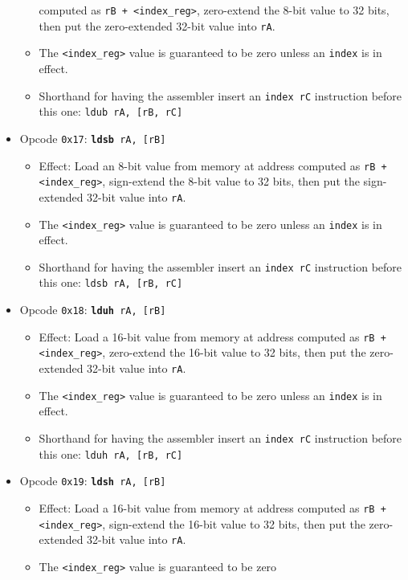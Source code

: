 \documentclass{article}
\begin{document}
\begin{itemize}
\begin{itemize}
		computed as \texttt{rB + <index\_reg>}, zero-extend
		the 8-bit value to 32 bits, then put the zero-extended 32-bit
		value into \texttt{rA}.
		\item The \texttt{<index\_reg>} value is guaranteed to be zero
		unless an \texttt{index} is in effect.
		\item Shorthand for having the assembler insert an
		\texttt{index rC} instruction before this one:
			\texttt{ldub rA, [rB, rC]}
		\end{itemize}
	\item Opcode \texttt{0x17}:
		\texttt{\textbf{ldsb} rA, [rB]}
		\begin{itemize}
		\item Effect: Load an 8-bit value from memory at address
		computed as \texttt{rB + <index\_reg>}, sign-extend
		the 8-bit value to 32 bits, then put the sign-extended 32-bit
		value into \texttt{rA}.
		\item The \texttt{<index\_reg>} value is guaranteed to be zero
		unless an \texttt{index} is in effect.
		\item Shorthand for having the assembler insert an
		\texttt{index rC} instruction before this one:
			\texttt{ldsb rA, [rB, rC]}
		\end{itemize}
	\item Opcode \texttt{0x18}:
		\texttt{\textbf{lduh} rA, [rB]}
		\begin{itemize}
		\item Effect: Load a 16-bit value from memory at address
		computed as \texttt{rB + <index\_reg>}, zero-extend
		the 16-bit value to 32 bits, then put the zero-extended 32-bit
		value into \texttt{rA}.
		\item The \texttt{<index\_reg>} value is guaranteed to be zero
		unless an \texttt{index} is in effect.
		\item Shorthand for having the assembler insert an
		\texttt{index rC} instruction before this one:
			\texttt{lduh rA, [rB, rC]}
		\end{itemize}
	\item Opcode \texttt{0x19}:
		\texttt{\textbf{ldsh} rA, [rB]}
		\begin{itemize}
		\item Effect: Load a 16-bit value from memory at address
		computed as \texttt{rB + <index\_reg>}, sign-extend
		the 16-bit value to 32 bits, then put the zero-extended 32-bit
		value into \texttt{rA}.
		\item The \texttt{<index\_reg>} value is guaranteed to be zero

\end{itemize}
\end{itemize}
\end{document}
